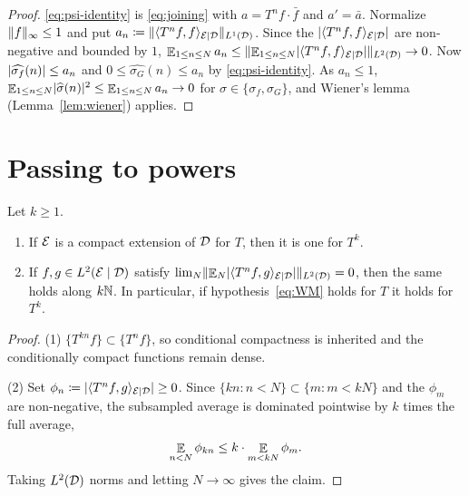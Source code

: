 \begin{proof}
  \eqref{eq:psi-identity} is \eqref{eq:joining} with $a = T^n f \cdot \bar f$ and $a' = \bar a$.
  Normalize $\lVert f \rVert_\infty \leq 1$ and put $a_n \coloneqq \lVert \langle T^n f, f \rangle_{\mathcal{E} \mid \mathcal{D}} \rVert_{L^1(\mathcal{D})}$.
  Since the $\lvert \langle T^n f, f \rangle_{\mathcal{E} \mid \mathcal{D}} \rvert$ are non-negative and bounded by $1$,
  $\mathop{\mathbb{E}}_{1 \leq n \leq N} a_n \leq \lVert \mathop{\mathbb{E}}_{1 \leq n \leq N} \lvert \langle T^n f, f \rangle_{\mathcal{E} \mid \mathcal{D}} \rvert \rVert_{L^2(\mathcal{D})} \to 0$.
  Now $\lvert \widehat{\sigma_f}(n) \rvert \leq a_n$ and $0 \leq \widehat{\sigma_G}(n) \leq a_n$ by
  \eqref{eq:psi-identity}.  As $a_n \leq 1$,
  $\mathop{\mathbb{E}}_{1 \leq n \leq N} \lvert \widehat\sigma(n) \rvert^2 \leq \mathop{\mathbb{E}}_{1 \leq n \leq N} a_n \to 0$ for
  $\sigma \in \{\sigma_f, \sigma_G\}$, and Wiener's lemma (Lemma~\ref{lem:wiener}) applies.
\end{proof}

\section{Passing to powers}

\begin{lemma}[Powers]
  \label{lem:powers}
  \leanok
  Let $k \geq 1$.
  \begin{enumerate}
    \item If $\mathcal{E}$ is a compact extension of $\mathcal{D}$ for $T$, then it is one for $T^k$.
    \item If $f, g \in L^2(\mathcal{E} \mid \mathcal{D})$ satisfy
      $\lim_N \lVert \mathop{\mathbb{E}}_{N} \lvert \langle T^n f, g \rangle_{\mathcal{E} \mid \mathcal{D}} \rvert \rVert_{L^2(\mathcal{D})} = 0$, then the same holds
      along $k\mathbb{N}$.  In particular, if hypothesis~\eqref{eq:WM} holds for $T$ it holds for $T^k$.
  \end{enumerate}
\end{lemma}

\begin{proof}
  (1) $\{T^{kn} f\} \subset \{T^n f\}$, so conditional compactness is inherited and the
  conditionally compact functions remain dense.

  (2) Set $\phi_n \coloneqq \lvert \langle T^n f, g \rangle_{\mathcal{E} \mid \mathcal{D}} \rvert \geq 0$.  Since
  $\{kn \colon n<N\} \subset \{m \colon m<kN\}$ and the $\phi_m$ are non-negative, the
  subsampled average is dominated pointwise by $k$ times the full average,
  \begin{equation} \label{eq:subsample}
    \mathop{\mathbb{E}}_{n<N} \phi _{kn} \leq k \cdot \mathop{\mathbb{E}}_{m<kN} \phi _m .
  \end{equation}
  Taking $L^2(\mathcal{D})$ norms and letting $N \to \infty$ gives the claim.
\end{proof}


